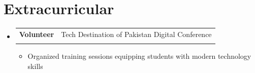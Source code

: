 \documentclass[letterpaper,11pt]{article}
\makeatletter
\newcommand{\resumeItem}[1]{
  \item\small{\color{textgray}#1\vspace{-2pt}}
}
\newcommand{\resumeSubheading}[4]{
  \vspace{-1pt}\item
    \begin{tabular*}{0.97\textwidth}[t]{l@{\extracolsep{\fill}}r}
      \textbf{\color{textwhite}#1} & \color{textgray}\small#2 \\
      \small\color{textgray}#3 & \small\color{textgray}#4 \\
    \end{tabular*}\vspace{-6pt}
}
\newcommand{\resumeSubHeadingListStart}{\begin{itemize}[leftmargin=0.1in, label={}]}
\newcommand{\resumeSubHeadingListEnd}{\end{itemize}}
\newcommand{\resumeItemListStart}{\begin{itemize}[leftmargin=0.15in, label={\color{accent}$\circ$}]}
\newcommand{\resumeItemListEnd}{\end{itemize}\vspace{-4pt}}
\makeatother
\begin{document}
\vspace{-12pt}

\section{Extracurricular}
\resumeSubHeadingListStart
\resumeSubheading
{Volunteer}{Tech Destination of Pakistan Digital Conference}
{}{}
\vspace{-16pt}
\resumeItemListStart
\resumeItem{Organized training sessions equipping students with modern technology skills}
\resumeItemListEnd
\resumeSubHeadingListEnd
\end{document}
